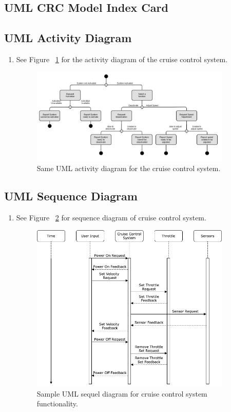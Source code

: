 \documentclass[preprint,11pt,3p]{article}
\begin{document}
\subsection{UML CRC Model Index Card}

\subsection{UML Activity Diagram}
\begin{enumerate}
	\item See Figure ~\ref{fig:activityUML} for the activity diagram of the cruise control system.
		\begin{figure}[H]
			\includegraphics[width=0.9\textwidth]{images/activityUML.jpg}
			\caption{Same UML activity diagram for the cruise control system.}
			\label{fig:activityUML}
		\end{figure} 
\end{enumerate}

\subsection{UML Sequence Diagram}
\begin{enumerate}
	\item 	See Figure ~\ref{fig:ccUML2} for sequence diagram of cruise control system.
			\begin{figure}[H]
				\includegraphics[width=0.9\textwidth]{images/ccUML.png}
				\caption{Sample UML sequel diagram for cruise control system functionality.}
				\label{fig:ccUML2}
			\end{figure}
\end{enumerate}
\end{document}
